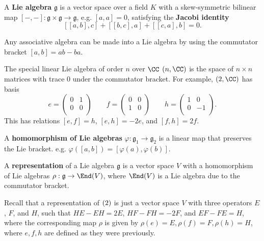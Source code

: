 \documentclass{article}
\begin{document}
\begin{df}
A \textbf{Lie algebra} $\mathfrak{g}$ is a vector space over a field $K$ with a
skew-symmetric bilinear map $[-,-] : \mathfrak{g} \times \mathfrak{g} \to
\mathfrak{g}$, e.g. $[a, a] = 0$, satisfying the \textbf{Jacobi identity}
\[ [[a, b], c] + [[b, c], a] + [[c, a], b] = 0. \]
\end{df}

\begin{ex}
Any associative algebra can be made into a Lie algebra by using the commutator
bracket $[a, b] = ab - ba$.
\end{ex}

\begin{ex}
The special linear Lie algebra of order $n$ over $\CC$ $\sl(n, \CC)$ is the
space of $n \times n$ matrices with trace $0$ under the commutator bracket. For
example, $\sl(2, \CC)$ has basis
\[ e = \begin{pmatrix} 0 & 1 \\ 0 & 0 \\ \end{pmatrix} \qquad f =
\begin{pmatrix} 0 & 0 \\ 1 & 0 \\ \end{pmatrix} \qquad h = \begin{pmatrix} 1 & 0
\\ 0 & -1 \\ \end{pmatrix}. \]
This has relations $[e, f] = h$, $[e, h] = -2e$, and $[f, h] = 2f$.
\end{ex}

\begin{df}
A \textbf{homomorphism of Lie algebras} $\varphi : \mathfrak{g}_1 \to
\mathfrak{g}_2$ is a linear map that preserves the Lie bracket. e.g.
$\varphi([a, b]) = [\varphi(a), \varphi(b)]$.
\end{df}

\begin{df}
A \textbf{representation} of a Lie algebra $\mathfrak{g}$ is a vector space $V$
with a homomorphism of Lie algebras $\rho : \mathfrak{g} \to \End(V)$, where
$\End(V)$ is a Lie algebra due to the commutator bracket.
\end{df}

\newpage
Recall that a representation of $\sl(2)$ is just a vector space $V$ with three
operators $E$, $F$, and $H$, such that $HE - EH = 2E$, $HF - FH = -2F$, and $EF
- FE = H$, where the corresponding map $\rho$ is given by $\rho(e) = E, \rho(f)
= F, \rho(h) = H$, where $e, f, h$ are defined as they were previously.
\end{document}
